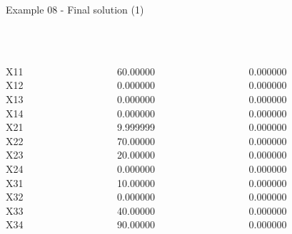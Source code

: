 \begin{frame}{Example 08 - Final solution (1)}
\footnotesize
{} \\
  \\

\begin{columns}[t]
\begin{column}{0.3\textwidth}
\\
X11\\
X12\\
X13\\
X14\\
X21\\
X22\\
X23\\
X24\\
X31\\
X32\\
X33\\
X34\\

\end{column}
\begin{column}{0.3\textwidth}
\\
60.00000\\
0.000000\\
0.000000\\
0.000000\\
9.999999\\
70.00000\\
20.00000\\
0.000000\\
10.00000\\
0.000000\\
40.00000\\
90.00000\\
\end{column}

\begin{column}{0.3\textwidth}
\\
0.000000\\
0.000000\\
0.000000\\
0.000000\\
0.000000\\
0.000000\\
0.000000\\
0.000000\\
0.000000\\
0.000000\\
0.000000\\
0.000000\\

\end{column}
\end{columns}

\end{frame}


